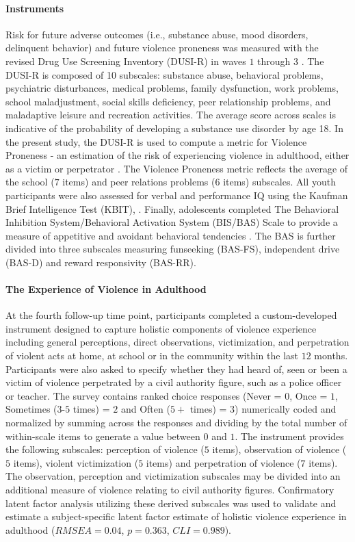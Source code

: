 \documentclass[utf8]{frontiersSCNS} %
\begin{document}
\paragraph{Instruments} Risk for future adverse outcomes (i.e., substance abuse, mood disorders, delinquent behavior) and future violence proneness was measured with the revised Drug Use Screening Inventory (DUSI-R) in waves $1$ through $3$ \citep{tarter1994reliability}. The DUSI-R is composed of 10 subscales: substance abuse, behavioral problems, psychiatric disturbances, medical problems, family dysfunction, work problems, school maladjustment, social skills deficiency, peer relationship problems, and maladaptive leisure and recreation activities. The average score across scales is indicative of the probability of developing a substance use disorder by age 18. In the present study, the DUSI-R is used to compute a metric for Violence Proneness - an estimation of the risk of experiencing violence in adulthood, either as a victim or perpetrator \citep{kirisci2009violence}. The Violence Proneness metric reflects the average of the school ($7$ items) and peer relations problems ($6$ items) subscales. All youth participants were also assessed for verbal and performance IQ using the Kaufman Brief Intelligence Test (KBIT), \citep{kaufman2004kaufman}. Finally, adolescents completed The Behavioral Inhibition System/Behavioral Activation System (BIS/BAS) Scale  to provide a measure of appetitive and avoidant behavioral tendencies \citep{carver1994behavioral}. The BAS is further divided into three subscales measuring funseeking (BAS-FS), independent drive (BAS-D) and reward responsivity (BAS-RR).
\paragraph{The Experience of Violence in Adulthood} At the fourth follow-up time point, participants completed a custom-developed instrument designed to capture holistic components of violence experience including general perceptions, direct observations, victimization, and perpetration of violent acts at home, at school or in the community within the last $12$ months. Participants were also asked to specify whether they had heard of, seen or been a victim of violence perpetrated by a civil authority figure, such as a police officer or teacher. The survey contains ranked choice responses (Never = $0$, Once = $1$, Sometimes ($3$-$5$ times) = $2$ and Often ($5+$ times) = $3$) numerically coded and normalized by summing across the responses and dividing by the total number of within-scale items to generate a value between $0$ and $1$. The instrument provides the following subscales: perception of violence ($5$ items), observation of violence ($5$ items), violent victimization ($5$ items) and perpetration of violence ($7$ items). The observation, perception and victimization subscales may be divided into an additional measure of violence relating to civil authority figures. Confirmatory latent factor analysis utilizing these derived subscales was used to validate and estimate a subject-specific latent factor estimate of holistic violence experience in adulthood ($RMSEA = 0.04$, $p = 0.363$, $CLI = 0.989$).
\end{document}
